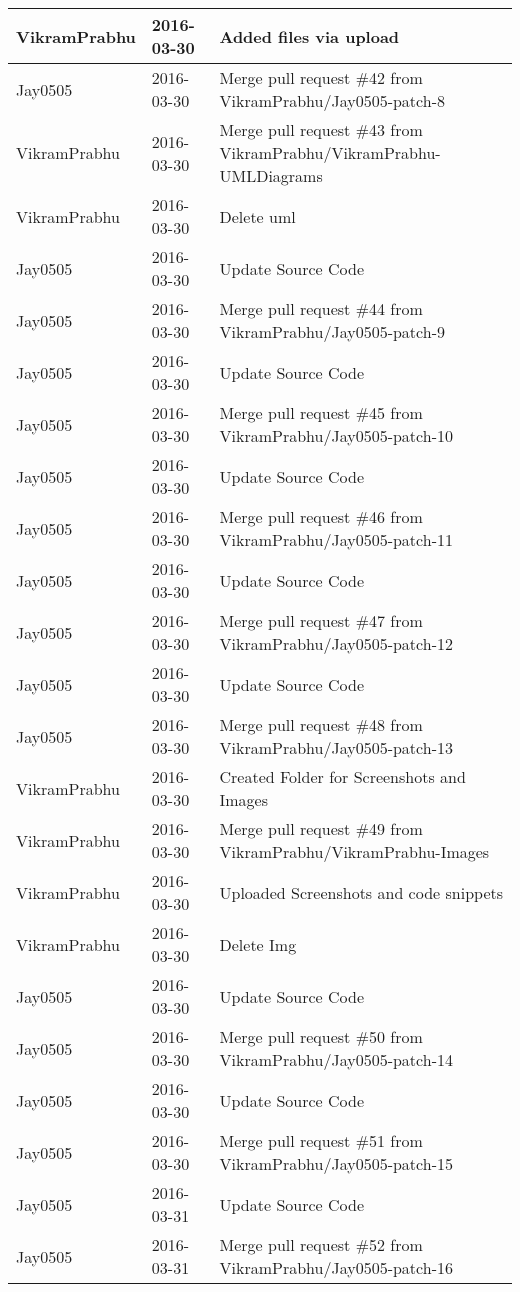 \documentclass[a4paper]{article}
\begin{document}
\begin{center}
\begin{longtable}{|l|l|l|}
VikramPrabhu & 2016-03-30 & Added files via upload \\ \hline
Jay0505 & 2016-03-30 & Merge pull request \#42 from VikramPrabhu/Jay0505-patch-8 \\ \hline
VikramPrabhu & 2016-03-30 & Merge pull request \#43 from VikramPrabhu/VikramPrabhu-UMLDiagrams \\ \hline
VikramPrabhu & 2016-03-30 & Delete uml \\ \hline
Jay0505 & 2016-03-30 & Update Source Code \\ \hline
Jay0505 & 2016-03-30 & Merge pull request \#44 from VikramPrabhu/Jay0505-patch-9 \\ \hline
Jay0505 & 2016-03-30 & Update Source Code \\ \hline
Jay0505 & 2016-03-30 & Merge pull request \#45 from VikramPrabhu/Jay0505-patch-10 \\ \hline
Jay0505 & 2016-03-30 & Update Source Code \\ \hline
Jay0505 & 2016-03-30 & Merge pull request \#46 from VikramPrabhu/Jay0505-patch-11 \\ \hline
Jay0505 & 2016-03-30 & Update Source Code \\ \hline
Jay0505 & 2016-03-30 & Merge pull request \#47 from VikramPrabhu/Jay0505-patch-12 \\ \hline
Jay0505 & 2016-03-30 & Update Source Code \\ \hline
Jay0505 & 2016-03-30 & Merge pull request \#48 from VikramPrabhu/Jay0505-patch-13 \\ \hline
VikramPrabhu & 2016-03-30 & Created Folder for Screenshots and Images \\ \hline
VikramPrabhu & 2016-03-30 & Merge pull request \#49 from VikramPrabhu/VikramPrabhu-Images \\ \hline
VikramPrabhu & 2016-03-30 & Uploaded Screenshots and code snippets \\ \hline
VikramPrabhu & 2016-03-30 & Delete Img \\ \hline
Jay0505 & 2016-03-30 & Update Source Code \\ \hline
Jay0505 & 2016-03-30 & Merge pull request \#50 from VikramPrabhu/Jay0505-patch-14 \\ \hline
Jay0505 & 2016-03-30 & Update Source Code \\ \hline
Jay0505 & 2016-03-30 & Merge pull request \#51 from VikramPrabhu/Jay0505-patch-15 \\ \hline
Jay0505 & 2016-03-31 & Update Source Code \\ \hline
Jay0505 & 2016-03-31 & Merge pull request \#52 from VikramPrabhu/Jay0505-patch-16 \\ \hline

\end{longtable}
\end{center}
\end{document}
